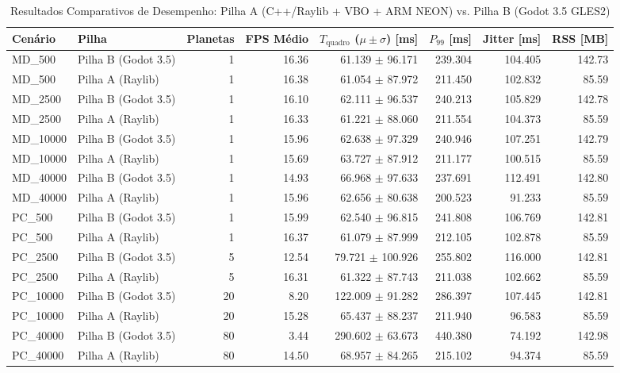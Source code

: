 \begin{table}[t]
\centering
\caption{Resultados Comparativos de Desempenho: Pilha A (C++/Raylib + VBO + ARM NEON) vs. Pilha B (Godot 3.5 GLES2)}
\label{tab:resultados_benchmark}
\begin{tabular}{@{}llrrrrrr@{}}
\toprule
\textbf{Cenário} & \textbf{Pilha} & \textbf{Planetas} & \textbf{FPS Médio} & \textbf{$T_{\text{quadro}}$ ($\mu \pm \sigma$) [ms]} & \textbf{$P_{99}$ [ms]} & \textbf{Jitter [ms]} & \textbf{RSS [MB]} \\
\midrule
MD\_500 & Pilha B (Godot 3.5) & 1 & 16.36 & 61.139 $\pm$ 96.171 & 239.304 & 104.405 & 142.73 \\
MD\_500 & Pilha A (Raylib) & 1 & 16.38 & 61.054 $\pm$ 87.972 & 211.450 & 102.832 & 85.59 \\
MD\_2500 & Pilha B (Godot 3.5) & 1 & 16.10 & 62.111 $\pm$ 96.537 & 240.213 & 105.829 & 142.78 \\
MD\_2500 & Pilha A (Raylib) & 1 & 16.33 & 61.221 $\pm$ 88.060 & 211.554 & 104.373 & 85.59 \\
MD\_10000 & Pilha B (Godot 3.5) & 1 & 15.96 & 62.638 $\pm$ 97.329 & 240.946 & 107.251 & 142.79 \\
MD\_10000 & Pilha A (Raylib) & 1 & 15.69 & 63.727 $\pm$ 87.912 & 211.177 & 100.515 & 85.59 \\
MD\_40000 & Pilha B (Godot 3.5) & 1 & 14.93 & 66.968 $\pm$ 97.633 & 237.691 & 112.491 & 142.80 \\
MD\_40000 & Pilha A (Raylib) & 1 & 15.96 & 62.656 $\pm$ 80.638 & 200.523 & 91.233 & 85.59 \\
PC\_500 & Pilha B (Godot 3.5) & 1 & 15.99 & 62.540 $\pm$ 96.815 & 241.808 & 106.769 & 142.81 \\
PC\_500 & Pilha A (Raylib) & 1 & 16.37 & 61.079 $\pm$ 87.999 & 212.105 & 102.878 & 85.59 \\
PC\_2500 & Pilha B (Godot 3.5) & 5 & 12.54 & 79.721 $\pm$ 100.926 & 255.802 & 116.000 & 142.81 \\
PC\_2500 & Pilha A (Raylib) & 5 & 16.31 & 61.322 $\pm$ 87.743 & 211.038 & 102.662 & 85.59 \\
PC\_10000 & Pilha B (Godot 3.5) & 20 & 8.20 & 122.009 $\pm$ 91.282 & 286.397 & 107.445 & 142.81 \\
PC\_10000 & Pilha A (Raylib) & 20 & 15.28 & 65.437 $\pm$ 88.237 & 211.940 & 96.583 & 85.59 \\
PC\_40000 & Pilha B (Godot 3.5) & 80 & 3.44 & 290.602 $\pm$ 63.673 & 440.380 & 74.192 & 142.98 \\
PC\_40000 & Pilha A (Raylib) & 80 & 14.50 & 68.957 $\pm$ 84.265 & 215.102 & 94.374 & 85.59 \\
\bottomrule
\end{tabular}
\end{table}
